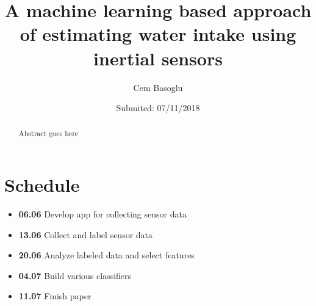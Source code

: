 \documentclass[twocolumn,fleqn,runningheads]{template/svjour2}[23.12.1232]
\begin{document}
\title{A machine learning based approach of estimating water intake using inertial sensors}

\author{Cem Basoglu}


\date{Submited: 07/11/2018}

\maketitle

\begin{abstract}
Abstract goes here
\end{abstract}






\clearpage





\newpage
\section*{Schedule}
\begin{itemize}
\item \textbf{06.06} Develop app for collecting sensor data
\item \textbf{13.06} Collect and label sensor data
\item \textbf{20.06} Analyze labeled data and select features
\item \textbf{04.07} Build various classifiers
\item \textbf{11.07} Finish paper
\end{itemize}
\end{document}
